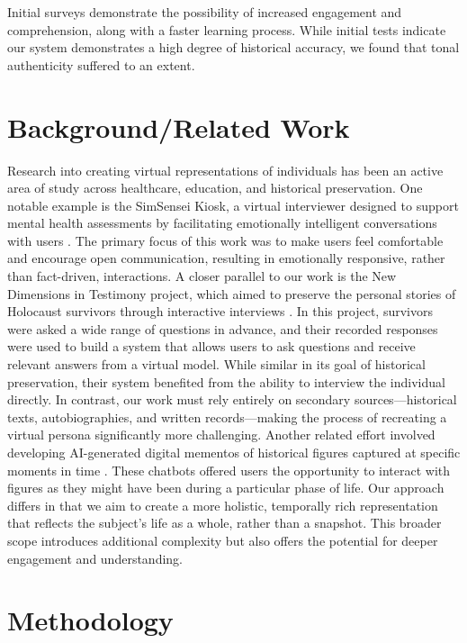\documentclass[sigconf]{aamas}
\begin{document}
Initial surveys demonstrate the possibility of increased engagement and comprehension, along with a faster learning process. While initial tests indicate our system demonstrates a high degree of historical accuracy, we found that tonal authenticity suffered to an extent.

\section{Background/Related Work}
Research into creating virtual representations of individuals has been an active area of study across healthcare, education, and historical preservation. One notable example is the SimSensei Kiosk, a virtual interviewer designed to support mental health assessments by facilitating emotionally intelligent conversations with users \cite{10.5555/2615731.2617415}. The primary focus of this work was to make users feel comfortable and encourage open communication, resulting in emotionally responsive, rather than fact-driven, interactions. A closer parallel to our work is the New Dimensions in Testimony project, which aimed to preserve the personal stories of Holocaust survivors through interactive interviews \cite{inproceedings}. In this project, survivors were asked a wide range of questions in advance, and their recorded responses were used to build a system that allows users to ask questions and receive relevant answers from a virtual model. While similar in its goal of historical preservation, their system benefited from the ability to interview the individual directly. In contrast, our work must rely entirely on secondary sources—historical texts, autobiographies, and written records—making the process of recreating a virtual persona significantly more challenging. Another related effort involved developing AI-generated digital mementos of historical figures captured at specific moments in time \cite{10.1145/3581641.3584065}. These chatbots offered users the opportunity to interact with figures as they might have been during a particular phase of life. Our approach differs in that we aim to create a more holistic, temporally rich representation that reflects the subject’s life as a whole, rather than a snapshot. This broader scope introduces additional complexity but also offers the potential for deeper engagement and understanding.



\section{Methodology}
\end{document}
